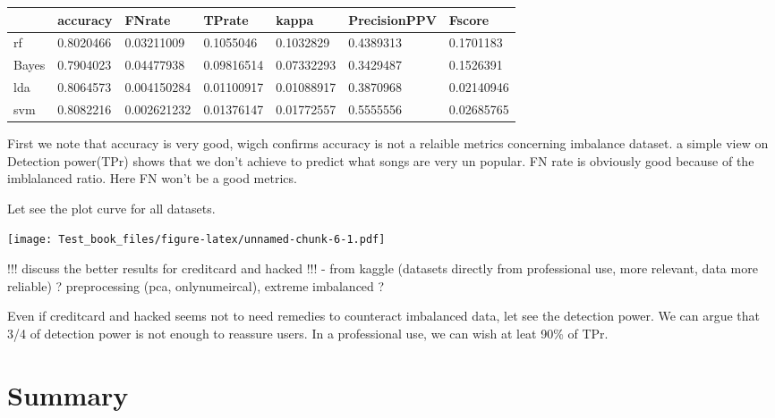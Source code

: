 \documentclass[
]{book}
\newenvironment{Shaded}{\begin{snugshade}}{\end{snugshade}}
\newcommand{\AttributeTok}[1]{\textcolor[rgb]{0.77,0.63,0.00}{#1}}
\newcommand{\DecValTok}[1]{\textcolor[rgb]{0.00,0.00,0.81}{#1}}
\newcommand{\FunctionTok}[1]{\textcolor[rgb]{0.00,0.00,0.00}{#1}}
\newcommand{\NormalTok}[1]{#1}
\newcommand{\SpecialCharTok}[1]{\textcolor[rgb]{0.00,0.00,0.00}{#1}}
\begin{document}
\begin{table}
\centering
\begin{tabular}{l|l|l|l|l|l|l}
\hline
  & accuracy & FNrate & TPrate & kappa & PrecisionPPV & Fscore\\
\hline
rf & 0.8020466 & 0.03211009 & 0.1055046 & 0.1032829 & 0.4389313 & 0.1701183\\
\hline
Bayes & 0.7904023 & 0.04477938 & 0.09816514 & 0.07332293 & 0.3429487 & 0.1526391\\
\hline
lda & 0.8064573 & 0.004150284 & 0.01100917 & 0.01088917 & 0.3870968 & 0.02140946\\
\hline
svm & 0.8082216 & 0.002621232 & 0.01376147 & 0.01772557 & 0.5555556 & 0.02685765\\
\hline
\end{tabular}
\end{table}

First we note that accuracy is very good, wigch confirms accuracy is not a relaible metrics concerning imbalance dataset. a simple view on Detection power(TPr) shows that we don't achieve to predict what songs are very un popular. FN rate is obviously good because of the imblalanced ratio. Here FN won't be a good metrics.

Let see the plot curve for all datasets.

\begin{Shaded}
\end{Shaded}

\texttt{[image: Test\_book\_files/figure-latex/unnamed-chunk-6-1.pdf]}

!!! discuss the better results for creditcard and hacked !!!
- from kaggle (datasets directly from professional use, more relevant, data more reliable) ? preprocessing (pca, onlynumeircal), extreme imbalanced ?

Even if creditcard and hacked seems not to need remedies to counteract imbalanced data, let see the detection power. We can argue that 3/4 of detection power is not enough to reassure users. In a professional use, we can wish at leat 90\% of TPr.

\hypertarget{summary}{%
\chapter{Summary}\label{summary}}

  
\end{document}

